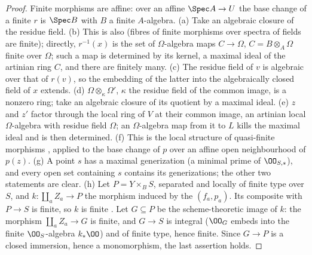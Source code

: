 \begin{proof}
Finite morphisms are affine: over an affine $\Spec A\to U$ the base change of a finite $r$ is $\Spec B$
with $B$ a finite $A$-algebra. (a) Take an algebraic closure of the residue field. (b) This is also
 (fibres of finite morphisms over spectra of
fields are finite); directly, $r^{-1}(x)$ is
the set of $\Omega$-algebra maps $C\to\Omega$, $C=B\otimes_A\Omega$ finite over $\Omega$; such a map is
determined by its kernel, a maximal ideal of the artinian ring $C$, and there are finitely many.
(c) The residue field of $v$ is algebraic over that of $r(v)$, so the embedding of the latter into
the algebraically closed field of $x$ extends. (d) $\Omega\otimes_{\kappa}\Omega'$, $\kappa$ the residue
field of the common image, is a nonzero ring; take an algebraic closure of its quotient by a maximal
ideal. (e) $z$ and $z'$ factor through the local ring of $V$ at their common image, an artinian local
$\Omega$-algebra with residue field $\Omega$; an $\Omega$-algebra map from it to $L$ kills the maximal
ideal and is then determined. (f) This is the local structure of quasi-finite morphisms
\cite[18.12.1]{Grothendieck1967}, applied to the base change of $p$ over an affine open
neighbourhood of $p(z)$. (g) A point $s$ has a maximal generization (a minimal prime of
$\OO_{S,s}$), and every open set containing $s$ contains its generizations; the other two
statements are clear. (h) Let $P=Y\times_BS$, separated and locally of finite type over $S$, and
$k\colon\coprod_aZ_a\to P$ the morphism induced by the $(f_a,p_a)$. Its composite with $P\to S$ is
finite, so $k$ is finite \cite[6.1.5]{Grothendieck1961ega2}. Let $G\subseteq P$ be the scheme-theoretic
image of $k$: the morphism $\coprod_aZ_a\to G$ is finite, and $G\to S$ is integral ($\OO_G$ embeds
into the finite $\OO_S$-algebra $k_\ast\OO$) and of finite type, hence finite. Since $G\to P$ is a
closed immersion, hence a monomorphism, the last assertion holds.
\end{proof}

